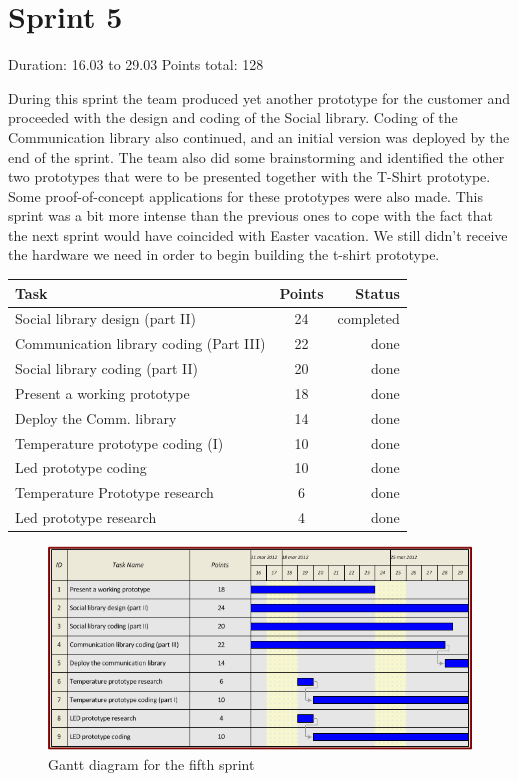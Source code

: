 \newpage

\section{Sprint 5}

Duration: 16.03 to 29.03
Points total: 128

During this sprint the team produced yet another prototype for the customer
and proceeded with the design and coding of the Social library.
Coding of the Communication library also continued, and an initial version
was deployed by the end of the sprint. The team also did some brainstorming
and identified the other two prototypes that were to be presented together with
the T-Shirt prototype. Some proof-of-concept applications for these
prototypes were also made. This sprint was a bit more intense than the previous
ones to cope with the fact that the next sprint would have coincided with Easter vacation.
We still didn't receive the hardware we need in order to begin building the t-shirt
prototype.

\begin{table}[ht!]
\begin{tabular}{ | l | c | r | }

\hline
\textbf{Task} & \textbf{Points} & \textbf{Status} \\
\hline

Social library design (part II)     & 24 & completed \\
\hline
Communication library coding (Part III) & 22 & done \\
\hline
Social library coding (part II)     & 20 & done \\
\hline
Present a working prototype		& 18 & done \\
\hline
Deploy the Comm. library		& 14 & done \\
\hline
Temperature prototype coding (I)    & 10 & done \\
\hline
Led prototype coding            & 10 & done \\
\hline
Temperature Prototype research		& 6  & done \\
\hline
Led prototype research			& 4  & done \\
\hline


\end{tabular}
\end{table}


\begin{figure}[h!]
\centering \includegraphics[scale=0.8]{img/sprints-gantt5.png}
\caption{Gantt diagram for the fifth sprint}
\label{fig:sprints-gantt5}
\end{figure}


